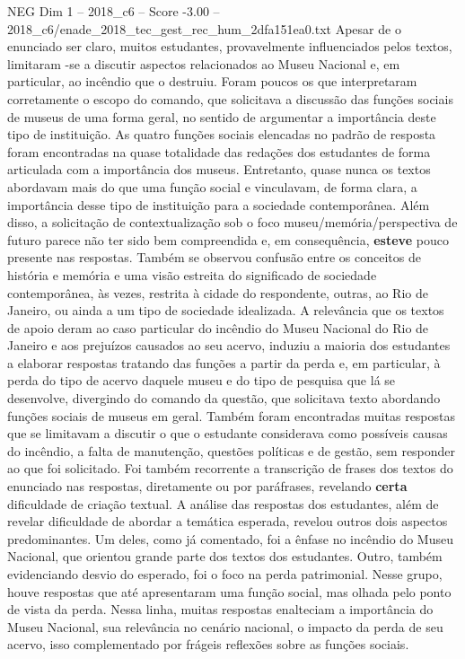 \begin{textsample}{NEG Dim 1 – 2018\_c6 – Score -3.00 – 2018\_c6/enade\_2018\_tec\_gest\_rec\_hum\_2dfa151ea0.txt}
Apesar de o enunciado ser claro, muitos estudantes, provavelmente influenciados pelos textos, limitaram -se a discutir aspectos relacionados ao Museu Nacional e, em particular, ao incêndio que o destruiu.
Foram poucos os que interpretaram corretamente o escopo do comando, que solicitava a discussão das funções sociais de museus de uma forma geral, no sentido de argumentar a importância deste tipo de instituição.
As quatro funções sociais elencadas no padrão de resposta foram encontradas na quase totalidade das redações dos estudantes de forma articulada com a importância dos museus.
Entretanto, quase nunca os textos abordavam mais do que uma função social e vinculavam, de forma clara, a importância desse tipo de instituição para a sociedade contemporânea.
Além disso, a solicitação de contextualização sob o foco museu/memória/perspectiva de futuro parece não ter sido bem compreendida e, em consequência, \textbf{esteve} pouco presente nas respostas.
Também se observou confusão entre os conceitos de história e memória e uma visão estreita do significado de sociedade contemporânea, às vezes, restrita à cidade do respondente, outras, ao Rio de Janeiro, ou ainda a um tipo de sociedade idealizada.
A relevância que os textos de apoio deram ao caso particular do incêndio do Museu Nacional do Rio de Janeiro e aos prejuízos causados ao seu acervo, induziu a maioria dos estudantes a elaborar respostas tratando das funções a partir da perda e, em particular, à perda do tipo de acervo daquele museu e do tipo de pesquisa que lá se desenvolve, divergindo do comando da questão, que solicitava texto abordando funções sociais de museus em geral.
Também foram encontradas muitas respostas que se limitavam a discutir o que o estudante considerava como possíveis causas do incêndio, a falta de manutenção, questões políticas e de gestão, sem responder ao que foi solicitado.
Foi também recorrente a transcrição de frases dos textos do enunciado nas respostas, diretamente ou por paráfrases, revelando \textbf{certa} dificuldade de criação textual.
A análise das respostas dos estudantes, além de revelar dificuldade de abordar a temática esperada, revelou outros dois aspectos predominantes.
Um deles, como já comentado, foi a ênfase no incêndio do Museu Nacional, que orientou grande parte dos textos dos estudantes.
Outro, também evidenciando desvio do esperado, foi o foco na perda patrimonial.
Nesse grupo, houve respostas que até apresentaram uma função social, mas olhada pelo ponto de vista da perda.
Nessa linha, muitas respostas enalteciam a importância do Museu Nacional, sua relevância no cenário nacional, o impacto da perda de seu acervo, isso complementado por frágeis reflexões sobre as funções sociais.

\end{textsample}
